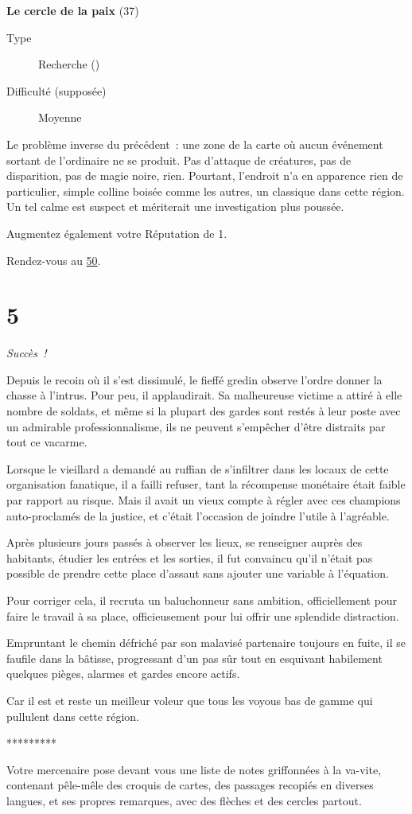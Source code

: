 \documentclass{report}
\newcommand{\gsection}[1]{
    \section{#1}
    \label{section-#1}
}
\newcommand{\glink}[1]{\hyperref[section-#1]{#1}}
\newcommand{\quest}[5]{
    \begin{mdframed}[innertopmargin=0.5cm,innerbottommargin=0.5cm,leftmargin=0.5cm,rightmargin=0.5cm]
        \begin{center}
            \textbf{#1} (#2)
        \end{center}
        \begin{description}
            \item[Type] #3
            \item[Difficulté (supposée)] #4
        \end{description}
        #5
    \end{mdframed}
}
\newcommand{\ellipse}{
    \begin{center}
        *********
    \end{center}
}
\newcommand{\success}{\emph{Succès !}}
\begin{document}
\quest{Le cercle de la paix}{37}{Recherche (\caduceus)}{Moyenne}{
Le problème inverse du précédent : une zone de la carte où aucun événement sortant de l'ordinaire ne se produit. Pas d'attaque de créatures, pas de disparition, pas de magie noire, rien. Pourtant, l'endroit n'a en apparence rien de particulier, simple colline boisée comme les autres, un classique dans cette région. Un tel calme est suspect et mériterait une investigation plus poussée.
}

Augmentez également votre Réputation de 1.

Rendez-vous au \glink{50}.

\gsection{5}

\success

Depuis le recoin où il s'est dissimulé, le fieffé gredin observe l'ordre donner la chasse à l'intrus. Pour peu, il applaudirait. Sa malheureuse victime a attiré à elle nombre de soldats, et même si la plupart des gardes sont restés à leur poste avec un admirable professionnalisme, ils ne peuvent s'empêcher d'être distraits par tout ce vacarme.

Lorsque le vieillard a demandé au ruffian de s'infiltrer dans les locaux de cette organisation fanatique, il a failli refuser, tant la récompense monétaire était faible par rapport au risque. Mais il avait un vieux compte à régler avec ces champions auto-proclamés de la justice, et c'était l'occasion de joindre l'utile à l'agréable.

Après plusieurs jours passés à observer les lieux, se renseigner auprès des habitants, étudier les entrées et les sorties, il fut convaincu qu'il n'était pas possible de prendre cette place d'assaut sans ajouter une variable à l'équation.

Pour corriger cela, il recruta un baluchonneur sans ambition, officiellement pour faire le travail à sa place, officieusement pour lui offrir une splendide distraction.

Empruntant le chemin défriché par son malavisé partenaire toujours en fuite, il se faufile dans la bâtisse, progressant d'un pas sûr tout en esquivant habilement quelques pièges, alarmes et gardes encore actifs.

Car il est et reste un meilleur voleur que tous les voyous bas de gamme qui pullulent dans cette région.

\ellipse

Votre mercenaire pose devant vous une liste de notes griffonnées à la va-vite, contenant pêle-mêle des croquis de cartes, des passages recopiés en diverses langues, et ses propres remarques, avec des flèches et des cercles partout.
\end{document}
